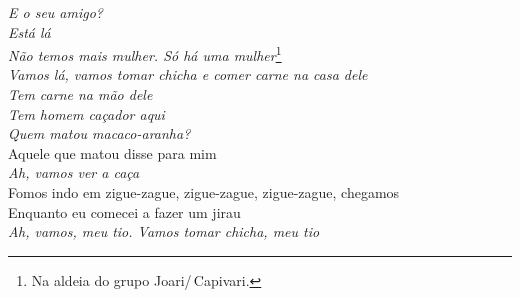 \begin{linenumbers}\begingroup\raggedright
 
\noindent \emph{E o seu amigo?}\\
  \emph{Está lá}\\
  \emph{Não temos mais mulher. Só há uma mulher}\footnote{Na aldeia do grupo
 Joari/\,Capivari.}\\
  \emph{Vamos lá, vamos tomar chicha e comer carne na casa dele}\\
  \emph{Tem carne na mão dele}\\
  \emph{Tem homem caçador aqui}\\
  \emph{Quem matou macaco-aranha?}\\
  Aquele que matou disse para mim\\
  \emph{Ah, vamos ver a caça}\\
  Fomos indo em zigue-zague, zigue-zague, zigue-zague, chegamos\\
  Enquanto eu comecei a fazer um jirau\\
  \emph{Ah, vamos, meu tio. Vamos tomar chicha, meu tio}
 
\end{linenumbers}\endgroup

\bigskip

